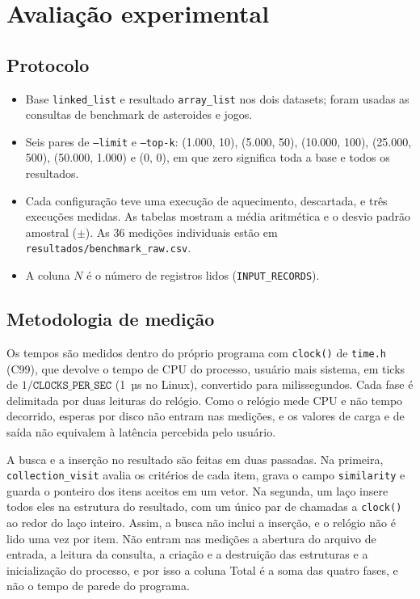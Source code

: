 \documentclass[11pt,a4paper]{article}
\begin{document}
\section{Avaliação experimental}

\subsection{Protocolo}

\begin{itemize}[nosep]
  \item Base \texttt{linked\_\allowbreak{}list} e resultado \texttt{array\_\allowbreak{}list} nos dois datasets; foram usadas as consultas de benchmark de asteroides e jogos.
  \item Seis pares de \texttt{--limit} e \texttt{--top-k}: (1.000, 10), (5.000, 50), (10.000, 100), (25.000, 500), (50.000, 1.000) e (0, 0), em que zero significa toda a base e todos os resultados.
  \item Cada configuração teve uma execução de aquecimento, descartada, e três execuções medidas. As tabelas mostram a média aritmética e o desvio padrão amostral ($\pm$). As 36 medições individuais estão em \texttt{resultados/\allowbreak{}benchmark\_\allowbreak{}raw.csv}.
  \item A coluna $N$ é o número de registros lidos (\texttt{INPUT\_\allowbreak{}RECORDS}).
\end{itemize}

\subsection{Metodologia de medição}\label{sec:met}

Os tempos são medidos dentro do próprio programa com \texttt{clock()} de \texttt{time.h} (C99), que devolve o tempo de CPU do processo, usuário mais sistema, em ticks de $1/\texttt{CLOCKS\_PER\_SEC}$ (1~µs no Linux), convertido para milissegundos. Cada fase é delimitada por duas leituras do relógio. Como o relógio mede CPU e não tempo decorrido, esperas por disco não entram nas medições, e os valores de carga e de saída não equivalem à latência percebida pelo usuário.

A busca e a inserção no resultado são feitas em duas passadas. Na primeira, \texttt{collection\_visit} avalia os critérios de cada item, grava o campo \texttt{similarity} e guarda o ponteiro dos itens aceitos em um vetor. Na segunda, um laço insere todos eles na estrutura do resultado, com um único par de chamadas a \texttt{clock()} ao redor do laço inteiro. Assim, a busca não inclui a inserção, e o relógio não é lido uma vez por item. Não entram nas medições a abertura do arquivo de entrada, a leitura da consulta, a criação e a destruição das estruturas e a inicialização do processo, e por isso a coluna Total é a soma das quatro fases, e não o tempo de parede do programa.
\end{document}
